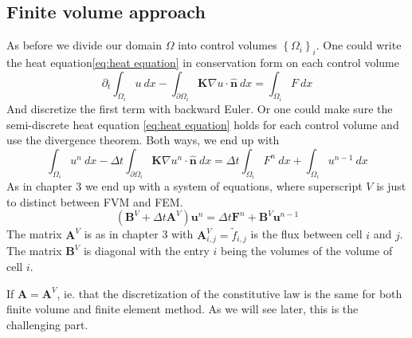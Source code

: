 \documentclass[../Main/main.tex]{subfiles}
\begin{document}
	\subsection*{Finite volume approach}
	As before we divide our domain $\Omega$ into control volumes $\left \{ \Omega_i \right \}_i$. One could write the heat equation\eqref{eq:heat equation} in conservation form on each control volume
	\begin{equation}
		\partial_t\int_{\Omega_i}u \ dx -\int_{\partial \Omega_i} \pmb{K}\nabla u \cdot \hat{\pmb{n}}\ dx = \int_{\Omega_i} F \ dx
	\end{equation}
	And discretize the first term with backward Euler. Or one could make sure the semi-discrete heat equation \eqref{eq:heat equation} holds for each control volume and use the divergence theorem. Both ways, we end up with
	\begin{equation}
		\int_{\Omega_i} u^n \ dx - \Delta t\int_{\partial \Omega_i} \pmb{K}\nabla u^n \cdot \hat{\pmb{n}}\ dx = \Delta t \int_{\Omega_i} F^n \ dx + \int_{\Omega_i} u^{n-1} \ dx
	\end{equation}
	As in chapter 3 we end up with a system of equations, where superscript $V$ is just to distinct between FVM and FEM.
	\begin{equation}\label{eq:heat fvm disc}
		(\pmb{B}^V + \Delta t \pmb{A}^V)\pmb{u}^n = \Delta t \pmb{F}^n + \pmb{B}^V\pmb{u}^{n-1}
	\end{equation}
	The matrix $\pmb{A}^V$ is as in chapter 3 with $\pmb{A}^V_{i,j}= \tilde{f}_{i,j}$ is the flux between cell $i$ and $j$. The matrix $\pmb{B}^V$ is diagonal with the entry $i$ being the volumes of the volume of cell $i$.

	If $\pmb{A}= \pmb{A}^V$, ie. that the discretization of the constitutive law is the same for both finite volume and finite element method. As we will see later, this is the challenging part.	
	
\end{document}
